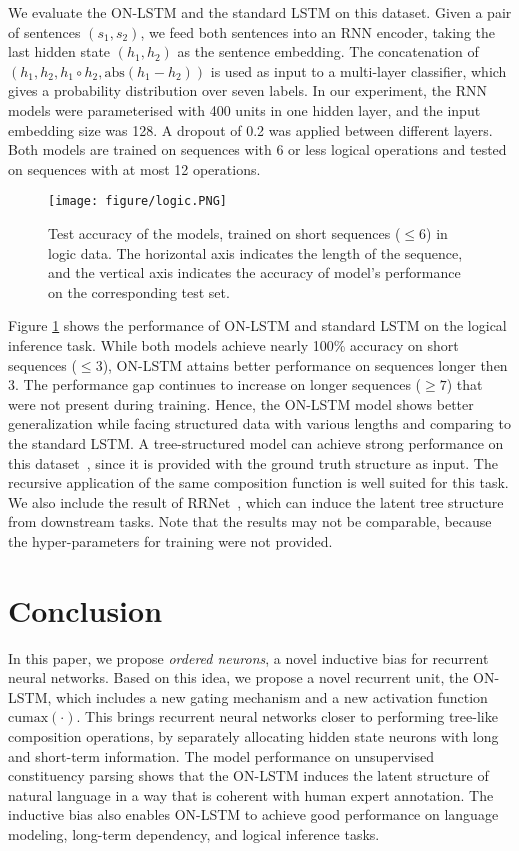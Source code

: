\documentclass{article} \usepackage{iclr2019_conference,times}
\newcommand{\cumax}{\mathrm{cumax}}
\begin{document}
We evaluate the ON-LSTM and the standard LSTM on this dataset.
Given a pair of sentences $(s_1, s_2)$, we feed both sentences into an RNN encoder, taking the last hidden state $(h_1, h_2)$ as the sentence embedding.
The concatenation of $(h_1, h_2, h_1 \circ h_2, \mathrm{abs}(h_1 - h_2))$ is used as input to a multi-layer classifier, which gives a probability distribution over seven labels.
In our experiment, the RNN models were parameterised with 400 units in one hidden layer, and the input embedding size was 128.
A dropout of 0.2 was applied between different layers.
Both models are trained on sequences with 6 or less logical operations and tested on sequences with at most 12 operations.

\begin{figure}
    \centering
    \texttt{[image: figure/logic.PNG]}
    \caption{Test accuracy of the models, trained on short sequences ($\leq 6$) in logic data. The horizontal
axis indicates the length of the sequence, and the vertical axis indicates the accuracy of model’s performance on the corresponding test set.}
\label{fig:logic}
\end{figure}


Figure \ref{fig:logic} shows the performance of ON-LSTM and standard LSTM on the logical inference task. While both models achieve nearly 100\% accuracy on short sequences ($\leq 3$), ON-LSTM attains better performance on sequences longer then 3.
The performance gap continues to increase on longer sequences ($\geq 7$) that were not present during training. 
Hence, the ON-LSTM model shows better generalization while facing structured data with various lengths and comparing to the standard LSTM. A tree-structured model can achieve strong performance on this dataset~\citep{bowman2015tree}, since it is provided with the ground truth structure as input.
The recursive application of the same composition function is well suited for this task.
We also include the result of RRNet~\citep{jacob2018learning}, which can induce the latent tree structure from downstream tasks. Note that the results may not be comparable, because the hyper-parameters for training were not provided. 


\section{Conclusion}
In this paper, we propose \emph{ordered neurons}, a novel inductive bias for recurrent neural networks. 
Based on this idea, we propose a novel recurrent unit, the ON-LSTM, which includes a new gating mechanism and a new activation function $\cumax(\cdot)$.
This brings recurrent neural networks closer to performing tree-like composition operations, by separately allocating hidden state neurons with long and short-term information.
The model performance on unsupervised constituency parsing shows that the ON-LSTM induces the latent structure of natural language in a way that is coherent with human expert annotation.
The inductive bias also enables ON-LSTM to achieve good performance on language modeling, long-term dependency, and logical inference tasks.
\end{document}
